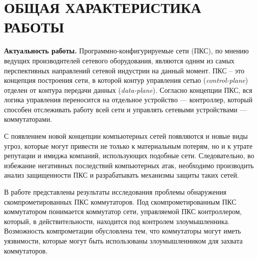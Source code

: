 \documentclass[14pt,autoref,href]{disser}
\theoremstyle{definition}
\begin{document}
\begin{spacing}{1}
\end{spacing}

\pagebreak
\normalsize

\pagestyle{plain}
\setcounter{page}{3}

\clearpage

\section*{ОБЩАЯ ХАРАКТЕРИСТИКА РАБОТЫ}

\let\introsect=\textbf

\textbf{Актуальность работы.} Программно-конфигурируемые сети (ПКС), по мнению ведущих производителей сетевого оборудования, являются одним из самых перспективных направлений сетевой индустрии на данный момент.
ПКС – это концепция построения сети, в которой контур управления сетью (\textit{control-plane}) отделен от контура передачи данных (\textit{data-plane}).
Согласно концепции ПКС, вся логика управления переносится на отдельное устройство --- контроллер, который способен отслеживать работу всей сети и управлять сетевыми устройствами --- коммутаторами.

С появлением новой концепции компьютерных сетей появляются и новые виды угроз, которые могут привести не только к материальным потерям, но и к утрате репутации и имиджа компаний, использующих подобные сети.
Следовательно, во избежание негативных последствий компьютерных атак, необходимо производить анализ защищенности ПКС и разрабатывать механизмы защиты таких сетей.

В работе представлены результаты исследования проблемы обнаружения скомпрометированных ПКС коммутаторов.
Под скомпрометированным ПКС коммутатором понимается коммутатор сети, управляемой ПКС контроллером, который, в действительности, находится под контролем злоумышленника.
Возможность компрометации обусловлена тем, что коммутаторы могут иметь уязвимости, которые могут быть использованы злоумышленником для захвата коммутаторов.
\end{document}
